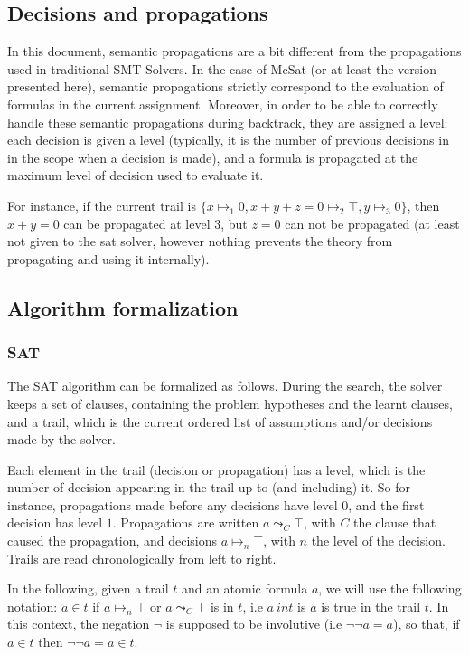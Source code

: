 \documentclass{article}
\begin{document}
\subsection{Decisions and propagations}

In this document, semantic propagations are a bit different from the propagations
used in traditional SMT Solvers. In the case of McSat (or at least the version presented here),
semantic propagations strictly correspond to the evaluation of formulas in the
current assignment. Moreover, in order to be able to correctly handle these semantic
propagations during backtrack, they are assigned a level: each decision is given a level
(typically, it is the number of previous decisions in in the scope when a decision is made),
and a formula is propagated at the maximum level of decision used to evaluate it.

For instance, if the current trail is $\{x \mapsto_1 0, x + y + z = 0 \mapsto_2 \top, y\mapsto_3 0\}$,
then $x + y = 0$ can be propagated at level $3$, but $z = 0$ can not be propagated (at least not
given to the sat solver, however nothing prevents the theory from propagating and using it internally).

\subsection{Algorithm formalization}

\subsubsection{SAT}

The SAT algorithm can be formalized as follows. During the search, the solver keeps
a set of clauses, containing the problem hypotheses and the learnt clauses, and
a trail, which is the current ordered list of assumptions and/or decisions made by
the solver.

Each element in the trail (decision or propagation) has a level, which is the number of decision
appearing in the trail up to (and including) it. So for instance, propagations made before any
decisions have level $0$, and the first decision has level $1$. Propagations are written
$a \leadsto_C \top$, with $C$ the clause that caused the propagation, and decisions
$a \mapsto_n \top$, with $n$ the level of the decision. Trails are read
chronologically from left to right.

In the following, given a trail $t$ and an atomic formula $a$, we will use the following notation:
$a \in t$ if $a \mapsto_n \top$ or $a \leadsto_C \top$ is in $t$, i.e $a\ in t$ is $a$ is true
in the trail $t$. In this context, the negation $\neg$ is supposed to be involutive (i.e $\neg \neg a = a$),
so that, if $a \in t$ then $\neg \neg a = a \in t$.
\end{document}
